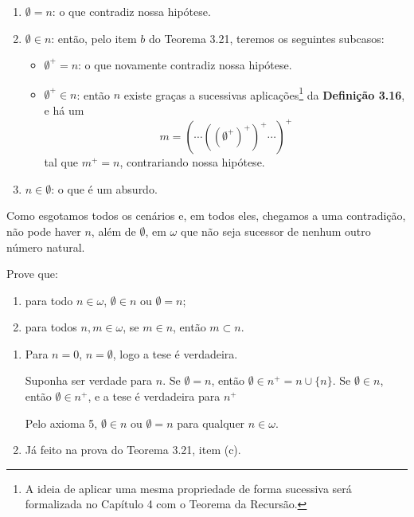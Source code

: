 \begin{enumerate}[label=(\alph{*})]
\begin{solucao}[ 2]
		\begin{enumerate}[label=\textit{\arabic*º --}, left=0pt, itemsep=0.5em]
			\item $\emptyset = n$: o que contradiz nossa hipótese.
			\item $\emptyset \in n$: então, pelo item $b$ do Teorema 3.21, teremos os seguintes subcasos:
			\begin{itemize}
				\item $\emptyset^+ = n$: o que novamente contradiz nossa hipótese.
				\item $\emptyset^+ \in n$: então $n$ existe graças a sucessivas aplicações\footnote{A ideia de aplicar uma mesma propriedade de forma sucessiva será formalizada no Capítulo 4 com o Teorema da Recursão.} da \textbf{Definição 3.16}, e há um 
				\[
				m = (\cdots((\emptyset^+)^+)^+\cdots)^+
				\]
				tal que $m^+ = n$, contrariando nossa hipótese.
			\end{itemize}
			\item $n \in \emptyset$: o que é um absurdo.
		\end{enumerate}
		
		Como esgotamos todos os cenários e, em todos eles, chegamos a uma contradição, não pode haver $n$, além de $\emptyset$, em $\omega$ que não seja sucessor de nenhum outro número natural.
	\end{solucao}
\end{enumerate}

\begin{exercicio}
	Prove que:
	\begin{enumerate}[label=(\alph{*})]
		\item para todo $n\in\omega$, $\emptyset\in n$ ou $\emptyset=n$;
		\item para todos $n,m\in\omega$, se $m\in n$, então $m\subset n$.
	\end{enumerate}
\end{exercicio}

\begin{enumerate}[label=(\alph{*})]
	\item Para $n=0$, $n=\emptyset$, logo a tese é verdadeira.
	
	Suponha ser verdade para $n$. Se $\emptyset=n$, então $\emptyset\in n^+=n\cup\{n\}$. Se $\emptyset\in n$, então $\emptyset\in n^+$, e a tese é verdadeira para $n^+$
	
	Pelo axioma 5, $\emptyset\in n$ ou $\emptyset=n$ para qualquer $n\in\omega$.
	\item Já feito na prova do Teorema 3.21, item (c).
\end{enumerate}


